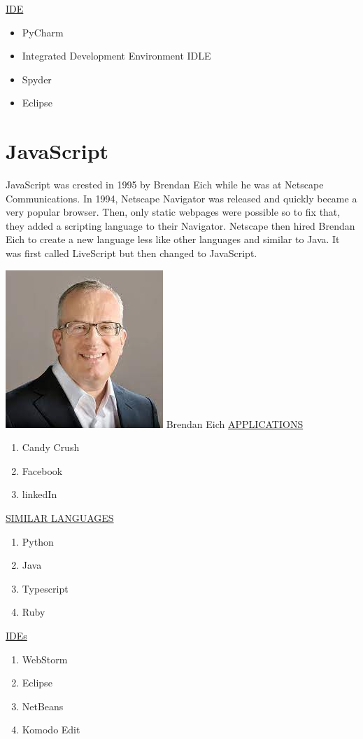 \documentclass{article}
\begin{document}
\underline{IDE}

\begin{itemize}
	\item PyCharm
	\item Integrated Development Environment {IDLE}
	\item Spyder
	\item Eclipse
\end{itemize}

\newpage
\section{\textbf{JavaScript}}
JavaScript was crested in 1995 by Brendan Eich while he was at Netscape Communications.
In 1994, Netscape Navigator was released and quickly became a very popular browser. Then, only static webpages were possible so to fix that, they added a scripting language to their Navigator. 
Netscape then hired Brendan Eich to create a new language less like other languages and similar to Java. It was first called LiveScript but then changed to JavaScript.

\newpage
\includegraphics{Brendan Eich.jpg}
{Brendan Eich}
\newpage
\underline{APPLICATIONS}
\begin{enumerate}
	\item Candy Crush
\item Facebook 
\item linkedIn
\end{enumerate}

\underline{SIMILAR LANGUAGES}
\begin{enumerate}
	\item Python
	\item Java
	\item Typescript
	\item Ruby
\end{enumerate}

\underline{IDEs}
\begin{enumerate}
	\item WebStorm
    \item Eclipse
	\item NetBeans
	\item Komodo Edit
	\end{enumerate}
\end{document}
